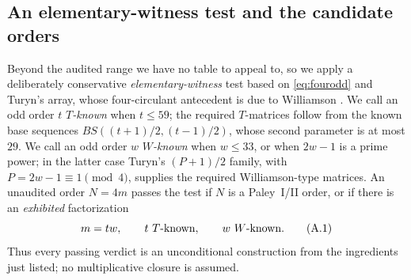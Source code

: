 \documentclass[11pt]{article}
\begin{document}
\subsection{An elementary-witness test and the candidate orders}
\label{app:candidates}

Beyond the audited range we have no table to appeal to, so we apply a
deliberately conservative \emph{elementary-witness} test based on
\eqref{eq:fourodd} and Turyn's array, whose four-circulant antecedent is due
to Williamson \cite{Williamson1944}.  We call an odd order \(t\)
\emph{\(T\)-known} when \(t\le59\); the required \(T\)-matrices follow
from the known base sequences
\(BS((t+1)/2,(t-1)/2)\), whose second parameter is at most \(29\).
We call an odd order \(w\) \emph{\(W\)-known} when \(w\le33\), or when
\(2w-1\) is a prime power; in the latter case Turyn's
\((P+1)/2\) family, with \(P=2w-1\equiv1\pmod4\), supplies the required
Williamson-type matrices.  An unaudited order \(N=4m\) passes the test
if \(N\) is a Paley~I/II order, or if there is an \emph{exhibited}
factorization
\[
        m=tw,\qquad t\ \hbox{\(T\)-known},\qquad
        w\ \hbox{\(W\)-known}.
        \tag{A.1}\label{eq:strictwitness}
\]
Thus every passing verdict is an unconditional construction from the
ingredients just listed; no multiplicative closure is assumed.
\end{document}
